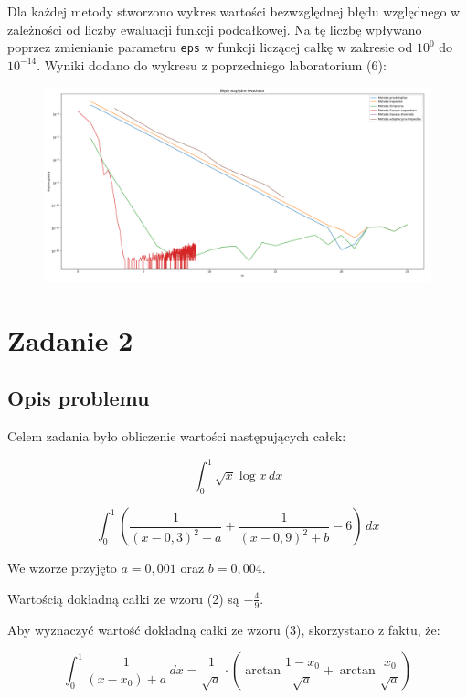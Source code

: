 \documentclass{article}
\begin{document}
	Dla każdej metody stworzono wykres wartości bezwzględnej błędu względnego w zależności od liczby ewaluacji funkcji podcałkowej. Na tę liczbę wpływano poprzez zmienianie parametru \texttt{eps} w funkcji liczącej całkę w zakresie od $10^{0}$ do $10^{-14}$. Wyniki dodano do wykresu z poprzedniego laboratorium (6):

	\begin{figure}[h]
		\centering
		\includegraphics[scale = 0.3]{wykres1.png}
	\end{figure}



	\section*{Zadanie 2}

	\subsection*{Opis problemu}

	Celem zadania było obliczenie wartości następujących całek:

	\begin{equation}
		\int_{0}^{1} \sqrt{x} \log x \,dx
	\end{equation}

	\begin{equation}
		\int_{0}^{1} \left(\frac{1}{(x-0,3)^2+a} + \frac{1}{(x-0,9)^2+b} - 6\right) \,dx
	\end{equation}

	We wzorze przyjęto $a = 0,001$ oraz $b = 0,004$. 

	Wartością dokładną całki ze wzoru (2) są $-\frac{4}{9}$.
	
	Aby wyznaczyć wartość dokładną całki ze wzoru (3), skorzystano z faktu, że:

	\begin{equation}
		\int_{0}^{1} \frac{1}{(x-x_0) + a} \,dx = \frac{1}{\sqrt{a}} \cdot \left(\arctan \frac{1-x_0}{\sqrt{a}} +\arctan \frac{x_0}{\sqrt{a}}\right)
	\end{equation}
\end{document}
